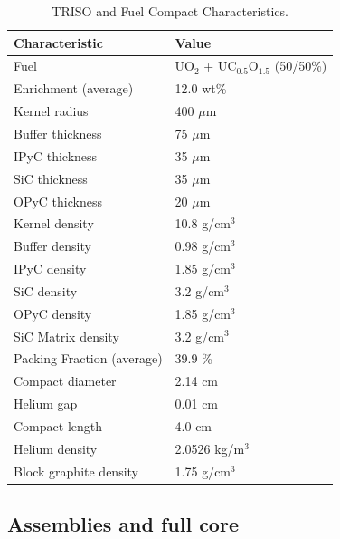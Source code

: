 \documentclass[11pt,letterpaper]{article}
\begin{document}
	\begin{table}[htbp!]
		\centering
	    \caption{TRISO and Fuel Compact Characteristics.}
	    \label{tab:compact}
		\begin{tabular}{l|l}
		\hline
		Characteristic                   & Value                \\ \hline
		Fuel                             & UO$_2$ + UC$_{0.5}$O$_{1.5}$ (50/50\%)  \\
		Enrichment (average)             & 12.0 wt\%            \\
		Kernel radius                    & 400 $\mu$m        \\
		Buffer thickness                 & 75 $\mu$m         \\
		IPyC thickness                   & 35 $\mu$m         \\
		SiC thickness                    & 35 $\mu$m         \\
		OPyC thickness                   & 20 $\mu$m         \\
    	Kernel density                   & 10.8 g/cm$^3$        \\
		Buffer density                   & 0.98 g/cm$^3$        \\
		IPyC density                     & 1.85 g/cm$^3$        \\
		SiC density                      & 3.2  g/cm$^3$        \\
		OPyC density                     & 1.85 g/cm$^3$        \\
		SiC Matrix density               & 3.2 g/cm$^3$         \\
		Packing Fraction (average)       & 39.9 \%              \\
		Compact diameter                 & 2.14 cm              \\
		Helium gap                       & 0.01 cm              \\
		Compact length                   & 4.0 cm               \\ 
        Helium density           		 & 2.0526 kg/m$^3$      \\
        Block graphite density           & 1.75 g/cm$^3$        \\ \hline

		\end{tabular}
	\end{table}

\subsection{Assemblies and full core}
\end{document}
